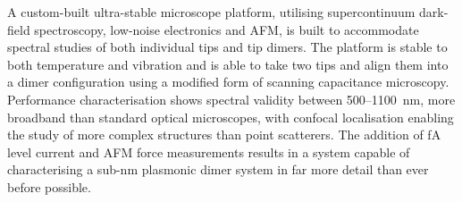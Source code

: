 \documentclass[12pt, a4paper, oneside]{book}
\begin{document}
A custom-built ultra-stable microscope platform, utilising supercontinuum dark-field spectroscopy, low-noise electronics and AFM, is built to accommodate spectral studies of both individual tips and tip dimers. The platform is stable to both temperature and vibration and is able to take two tips and align them into a dimer configuration using a modified form of scanning capacitance microscopy. Performance characterisation shows spectral validity between 500--\SI{1100}{nm}, more broadband than standard optical microscopes, with confocal localisation enabling the study of more complex structures than point scatterers. The addition of \si{fA} level current and AFM force measurements results in a system capable of characterising a sub-nm plasmonic dimer system in far more detail than ever before possible.

\ifstandalone
\begin{singlespace}
\printbibliography[notcategory=fullcited]
\end{singlespace}
\fi
\end{document}
